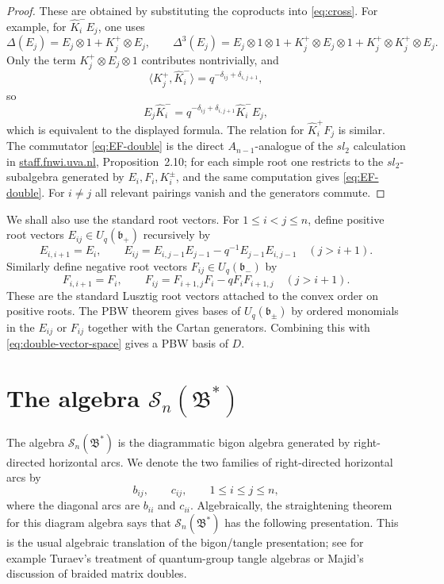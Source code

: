 \documentclass[11pt]{article}
\newcommand{\bcS}{\mathcal S}
\newcommand{\fB}{\mathfrak B}
\newcommand{\fb}{\mathfrak b}
\newcommand{\la}{\langle}
\newcommand{\ra}{\rangle}
\newcommand{\Khat}{\widehat K}
\begin{document}
\begin{proof}
These are obtained by substituting the coproducts into \eqref{eq:cross}.  For example, for \(\Khat_i^-E_j\), one uses
\[
\Delta(E_j)=E_j\otimes 1+K_j^+\otimes E_j,\qquad
\Delta^3(E_j)=E_j\otimes1\otimes1+K_j^+\otimes E_j\otimes1+K_j^+\otimes K_j^+\otimes E_j.
\]
Only the term \(K_j^+\otimes E_j\otimes1\) contributes nontrivially, and
\[
\la K_j^+,\Khat_i^-\ra
=
q^{-\delta_{ij}+\delta_{i,j+1}},
\]
so
\[
E_j\Khat_i^-=
q^{-\delta_{ij}+\delta_{i,j+1}}\Khat_i^-E_j,
\]
which is equivalent to the displayed formula.  The relation for \(\Khat_i^+F_j\) is similar.  The commutator \eqref{eq:EF-double} is the direct \(A_{n-1}\)-analogue of the \(sl_2\) calculation in
\href{https://staff.fnwi.uva.nl/j.v.stokman/quantumdouble2.pdf}{staff.fnwi.uva.nl}, Proposition~2.10; for each simple root one restricts to the \(sl_2\)-subalgebra generated by \(E_i,F_i,K_i^\pm\), and the same computation gives \eqref{eq:EF-double}.  For \(i\neq j\) all relevant pairings vanish and the generators commute.
\end{proof}

We shall also use the standard root vectors.  For \(1\le i<j\le n\), define positive root vectors \(E_{ij}\in U_q(\fb_+)\) recursively by
\[
E_{i,i+1}=E_i,\qquad
E_{ij}=E_{i,j-1}E_{j-1}-q^{-1}E_{j-1}E_{i,j-1}\quad(j>i+1).
\]
Similarly define negative root vectors \(F_{ij}\in U_q(\fb_-)\) by
\[
F_{i,i+1}=F_i,\qquad
F_{ij}=F_{i+1,j}F_i-qF_iF_{i+1,j}\quad(j>i+1).
\]
These are the standard Lusztig root vectors attached to the convex order on positive roots.  The PBW theorem gives bases of \(U_q(\fb_\pm)\) by ordered monomials in the \(E_{ij}\) or \(F_{ij}\) together with the Cartan generators.  Combining this with \eqref{eq:double-vector-space} gives a PBW basis of \(D\).

\section{The algebra \(\bcS_n(\fB^*)\)}

The algebra \(\bcS_n(\fB^*)\) is the diagrammatic bigon algebra generated by right-directed horizontal arcs.  We denote the two families of right-directed horizontal arcs by
\[
b_{ij},\qquad c_{ij},\qquad 1\le i\le j\le n,
\]
where the diagonal arcs are \(b_{ii}\) and \(c_{ii}\).  Algebraically, the straightening theorem for this diagram algebra says that \(\bcS_n(\fB^*)\) has the following presentation.  This is the usual algebraic translation of the bigon/tangle presentation; see for example Turaev's treatment of quantum-group tangle algebras or Majid's discussion of braided matrix doubles.
\end{document}
